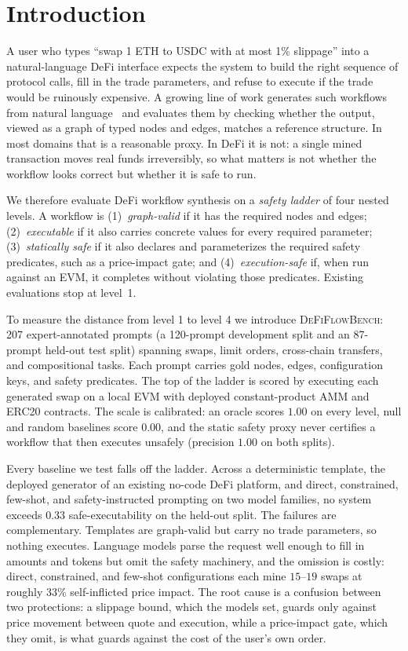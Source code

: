 \section{Introduction}
\label{sec:intro}

A user who types ``swap 1 ETH to USDC with at most 1\% slippage'' into a
natural-language DeFi interface expects the system to build the right
sequence of protocol calls, fill in the trade parameters, and refuse to
execute if the trade would be ruinously expensive. A growing line of work
generates such workflows from natural
language~\cite{worfbench2025,chat2workflow2026,flowmind2023} and
evaluates them by checking whether the output, viewed as a graph of typed
nodes and edges, matches a reference structure. In most domains that is a
reasonable proxy. In DeFi it is not: a single mined transaction moves
real funds irreversibly, so what matters is not whether the workflow
looks correct but whether it is safe to run.

We therefore evaluate DeFi workflow synthesis on a \emph{safety ladder}
of four nested levels. A workflow is (1)~\emph{graph-valid} if it has the
required nodes and edges; (2)~\emph{executable} if it also carries
concrete values for every required parameter; (3)~\emph{statically safe}
if it also declares and parameterizes the required safety predicates,
such as a price-impact gate; and (4)~\emph{execution-safe} if, when run
against an EVM, it completes without violating those predicates.
Existing evaluations stop at level~1.

To measure the distance from level 1 to level 4 we introduce
\textsc{DeFiFlowBench}: 207 expert-annotated prompts (a 120-prompt
development split and an 87-prompt held-out test split) spanning swaps,
limit orders, cross-chain transfers, and compositional tasks. Each prompt
carries gold nodes, edges, configuration keys, and safety predicates. The
top of the ladder is scored by executing each generated swap on a local
EVM with deployed constant-product AMM and ERC20 contracts. The scale is
calibrated: an oracle scores $1.00$ on every level, null and random
baselines score $0.00$, and the static safety proxy never certifies a
workflow that then executes unsafely (precision $1.00$ on both splits).

Every baseline we test falls off the ladder. Across a deterministic
template, the deployed generator of an existing no-code DeFi platform,
and direct, constrained, few-shot, and safety-instructed prompting on two
model families, no system exceeds $0.33$ safe-executability on the
held-out split. The failures are complementary. Templates are graph-valid
but carry no trade parameters, so nothing executes. Language models parse
the request well enough to fill in amounts and tokens but omit the safety
machinery, and the omission is costly: direct, constrained, and few-shot
configurations each mine $15$--$19$ swaps at roughly $33\%$
self-inflicted price impact. The root cause is a confusion between two
protections: a slippage bound, which the models set, guards only against
price movement between quote and execution, while a price-impact gate,
which they omit, is what guards against the cost of the user's own order.

